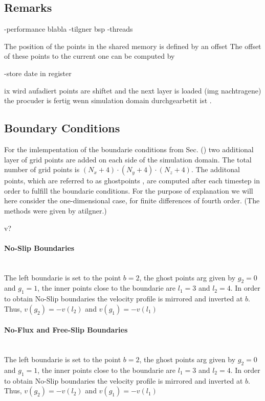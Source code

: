 \subsection{Remarks}

-performance blabla
-tilgner bsp
-threads

The position of the points in the shared memory is defined by an offset
The offset of these points to the current one can be computed by

-store date in register

ix wird aufadiert points are shiftet  and the next layer is loaded (img nachtragene)
the procuder is fertig wenn simulation domain  durchgearbetit ist .

\subsection{Boundary Conditions}

For the imlempentation of the boundarie conditions from Sec. () two additional layer of grid points
are added on each side of the simulation domain.
The total number of grid points is ${(N_x + 4)\cdot(N_y + 4)\cdot(N_z + 4)}$.
The additonal points, which are referred to as ghostpoints \citep{ctie},
are computed after each timestep in order to fulfill the boundarie conditions.
For the purpose of explanation we will here consider the one-dimensional case,
for finite differences of fourth order. (The methods were given by atilgner.)

v?

\paragraph{No-Slip Boundaries}\mbox{}\\

The left boundarie is set to the point $b=2$,
the ghost points arg given by $g_2=0$ and $g_1=1$, the inner points close
to the boundarie are $l_1=3$ and $l_2=4$.
In order to obtain No-Slip boundaries the velocity profile is mirrored and inverted
at $b$. Thus, $v(g_2) = -v(l_2)$ and  $v(g_1) = -v(l_1)$



\paragraph{No-Flux and Free-Slip Boundaries}\mbox{}\\

The left boundarie is set to the point $b=2$,
the ghost points arg given by $g_2=0$ and $g_1=1$, the inner points close
to the boundarie are $l_1=3$ and $l_2=4$.
In order to obtain No-Slip boundaries the velocity profile is mirrored and inverted
at $b$. Thus, $v(g_2) = -v(l_2)$ and  $v(g_1) = -v(l_1)$


